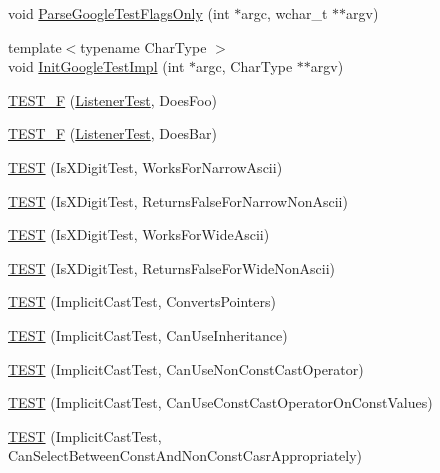 \begin{DoxyCompactItemize}
\item 
void \mbox{\hyperlink{namespacetesting_1_1internal_aa3c81a67914856448d0778990d9d9cab}{Parse\+Google\+Test\+Flags\+Only}} (int $\ast$argc, wchar\+\_\+t $\ast$$\ast$argv)
\item 
{\footnotesize template$<$typename Char\+Type $>$ }\\void \mbox{\hyperlink{namespacetesting_1_1internal_ac3c6fa93391768aa91c6238b31aaeeb5}{Init\+Google\+Test\+Impl}} (int $\ast$argc, Char\+Type $\ast$$\ast$argv)
\item 
\mbox{\hyperlink{namespacetesting_1_1internal_a7e113e9c70d45d89fe1703e58ff083b9}{T\+E\+S\+T\+\_\+F}} (\mbox{\hyperlink{classtesting_1_1internal_1_1ListenerTest}{Listener\+Test}}, Does\+Foo)
\item 
\mbox{\hyperlink{namespacetesting_1_1internal_a02cef32090020d164460dd3d9f8e2852}{T\+E\+S\+T\+\_\+F}} (\mbox{\hyperlink{classtesting_1_1internal_1_1ListenerTest}{Listener\+Test}}, Does\+Bar)
\item 
\mbox{\hyperlink{namespacetesting_1_1internal_a0c1e055c001e4dbb874f00a46c25bb00}{T\+E\+ST}} (Is\+X\+Digit\+Test, Works\+For\+Narrow\+Ascii)
\item 
\mbox{\hyperlink{namespacetesting_1_1internal_a7cd9d67d4164d2aeb4ceb3ed253c7d2d}{T\+E\+ST}} (Is\+X\+Digit\+Test, Returns\+False\+For\+Narrow\+Non\+Ascii)
\item 
\mbox{\hyperlink{namespacetesting_1_1internal_af76bca685fddffc0ecda1464b1b6a0a4}{T\+E\+ST}} (Is\+X\+Digit\+Test, Works\+For\+Wide\+Ascii)
\item 
\mbox{\hyperlink{namespacetesting_1_1internal_a771232ed3801fa49cbd4bbe11b318fe3}{T\+E\+ST}} (Is\+X\+Digit\+Test, Returns\+False\+For\+Wide\+Non\+Ascii)
\item 
\mbox{\hyperlink{namespacetesting_1_1internal_a5d2ec1128c80363b06070f403f682490}{T\+E\+ST}} (Implicit\+Cast\+Test, Converts\+Pointers)
\item 
\mbox{\hyperlink{namespacetesting_1_1internal_a1b304dcd3ac71095f2e7d9e9b43c4755}{T\+E\+ST}} (Implicit\+Cast\+Test, Can\+Use\+Inheritance)
\item 
\mbox{\hyperlink{namespacetesting_1_1internal_a8554484c7c0ea536bc393c254490aaff}{T\+E\+ST}} (Implicit\+Cast\+Test, Can\+Use\+Non\+Const\+Cast\+Operator)
\item 
\mbox{\hyperlink{namespacetesting_1_1internal_af7f631f9fbde27b19a65d50fc29e1420}{T\+E\+ST}} (Implicit\+Cast\+Test, Can\+Use\+Const\+Cast\+Operator\+On\+Const\+Values)
\item 
\mbox{\hyperlink{namespacetesting_1_1internal_a62a3b62658f9d47733cb7b5c8f69b2ad}{T\+E\+ST}} (Implicit\+Cast\+Test, Can\+Select\+Between\+Const\+And\+Non\+Const\+Casr\+Appropriately)

\end{DoxyCompactItemize}
